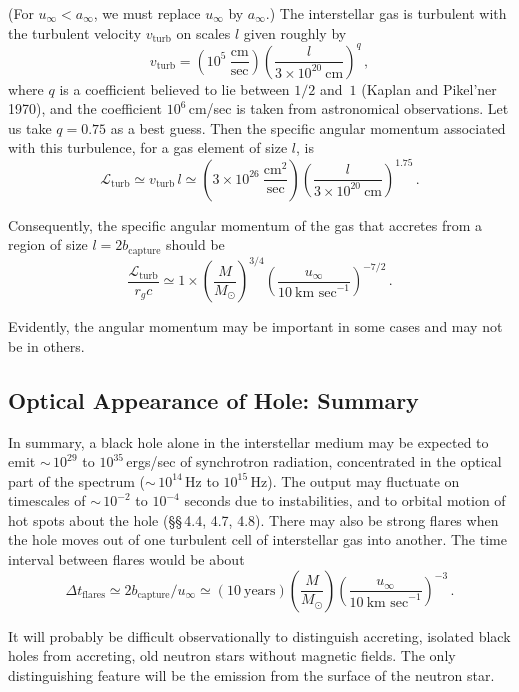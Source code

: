 (For $u_\infty < a_\infty$, we must replace $u_\infty$ by $a_\infty$.) The interstellar gas is turbulent with
the turbulent velocity $v_\text{turb}$ on scales $l$ given roughly by
%
\begin{equation}
v_\text{turb} = \left(10^5~\frac{\text{cm}}{\text{sec}}\right)
\left(\frac{l}{3 \times 10^{20}~\text{cm}}\right)^{q}\,,
\tag{4.8.8}
\end{equation}
%
where $q$ is a coefficient believed to lie between $1/2$ and~$1$ (Kaplan and Pikel'ner
1970), and the coefficient $10^6$\,cm/sec is taken from astronomical observations.
Let us take $q = 0.75$ as a best guess. Then the specific angular momentum
associated with this turbulence, for a gas element of size $l$, is
%
\begin{equation}
\mathscr{L}_\text{turb} \simeq v_\text{turb}\, l
\simeq \left(3 \times 10^{26}~\frac{\text{cm}^2}{\text{sec}}\right)
\left(\frac{l}{3 \times 10^{20}~\text{cm}}\right)^{1.75}\,.
\tag{4.8.9}
\end{equation}

Consequently, the specific angular momentum of the gas that accretes from a
region of size $l = 2b_\text{capture}$ should be
%
\begin{equation}
\frac{\mathscr{L}_\text{turb}}{r_g c}
\simeq 1 \times
\left(\frac{M}{M_\odot}\right)^{3/4}
\left(\frac{u_\infty}{10~\text{km~sec}^{-1}}\right)^{-7/2}\,.
\tag{4.8.10}
\end{equation}

Evidently, the angular momentum may be important in some cases and may not
be in others.


\subsection{Optical Appearance of Hole: Summary}
\label{sec:4.9}

In summary, a black hole alone in the interstellar medium may be expected to
emit ${\sim}\,10^{29}$ to $10^{35}$\,ergs/sec of synchrotron radiation, concentrated in the
optical part of the spectrum (${\sim}\,10^{14}$\,Hz to $10^{15}$\,Hz). The output may
fluctuate on timescales of ${\sim}\,10^{-2}$ to $10^{-4}$ seconds due to instabilities, and to
orbital motion of hot spots about the hole (\S\S\,4.4, 4.7, 4.8). There may also
be strong flares when the hole moves out of one turbulent cell of interstellar
gas into another. The time interval between flares would be about
%
\begin{equation}
\Delta t_\text{flares}
\simeq 2b_\text{capture}/u_\infty
\simeq (10~\text{years})
\left(\frac{M}{M_\odot}\right)
\left(\frac{u_\infty}{10~\text{km~sec}^{-1}}\right)^{-3}\,.
\tag{4.9.1}
\end{equation}

It will probably be difficult observationally to distinguish accreting, isolated
black holes from accreting, old neutron stars without magnetic fields. The only
distinguishing feature will be the emission from the surface of the neutron star.
